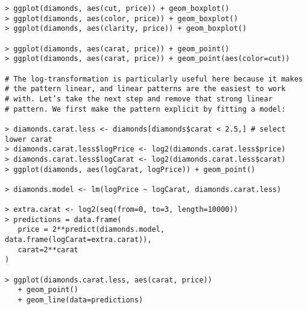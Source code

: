 \documentclass{article}[11pt]
\begin{document}
\begin{verbatim}
> ggplot(diamonds, aes(cut, price)) + geom_boxplot()
> ggplot(diamonds, aes(color, price)) + geom_boxplot()
> ggplot(diamonds, aes(clarity, price)) + geom_boxplot()

> ggplot(diamonds, aes(carat, price)) + geom_point()
> ggplot(diamonds, aes(carat, price)) + geom_point(aes(color=cut))

# The log-transformation is particularly useful here because it makes
# the pattern linear, and linear patterns are the easiest to work
# with. Let’s take the next step and remove that strong linear
# pattern. We first make the pattern explicit by fitting a model:

> diamonds.carat.less <- diamonds[diamonds$carat < 2.5,] # select lower carat
> diamonds.carat.less$logPrice <- log2(diamonds.carat.less$price)
> diamonds.carat.less$logCarat <- log2(diamonds.carat.less$carat)
> ggplot(diamonds, aes(logCarat, logPrice)) + geom_point()

> diamonds.model <- lm(logPrice ~ logCarat, diamonds.carat.less)

> extra.carat <- log2(seq(from=0, to=3, length=10000))
> predictions = data.frame(
   price = 2**predict(diamonds.model, data.frame(logCarat=extra.carat)),
   carat=2**carat
)

> ggplot(diamonds.carat.less, aes(carat, price))
   + geom_point() 
   + geom_line(data=predictions)
\end{verbatim}
\end{document}
